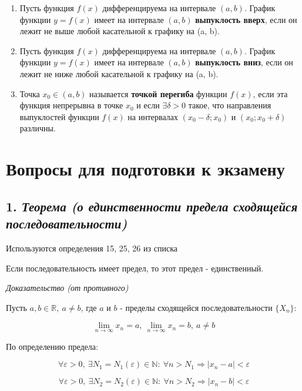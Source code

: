 \begin{enumerate}
\item Пусть функция $f(x)$ дифференцируема на интервале $(a, b)$. График функции $y = f(x)$ имеет на интервале $(a, b)$ \textbf{выпуклость вверх}, если он лежит не выше любой касательной к графику на (a, b).
\item Пусть функция $f(x)$ дифференцируема на интервале $(a, b)$. График функции $y = f(x)$ имеет на интервале $(a, b)$ \textbf{выпуклость вниз}, если он лежит не ниже любой касательной к графику на (a, b).
\item Точка $x_0 \in (a,b)$ называется \textbf{точкой перегиба} функции $f(x)$, если эта функция непрерывна в точке $x_0$ и если $\exists \delta > 0$ такое, что направления выпуклостей функции $f(x)$ на интервалах $(x_0-\delta; x_0)$ и $(x_0; x_0+\delta)$ различны.

\end{enumerate}
\newpage 
\section*{Вопросы для подготовки к экзамену}
\subsection*{1. \textit{Теорема (о единственности предела сходящейся последовательности)}}
\begin{Quote2} 
\small\centering 

Используются определения 15, 25, 26 из списка \end{Quote2} 

Если последовательность имеет предел, то этот предел - единственный.
\vspace*{20pt} 

\textit{Доказательство (от противного)}

Пусть $a, b \in \mathbb{R}, \ a \neq b$, где $a$ и $b$ - пределы сходящейся последовательности $\{X_n\}$:

$$
\lim\limits_{n \to \infty} x_n = a,\ \lim\limits_{n \to \infty} x_n = b, \ a \neq b
$$

По определению предела:

$$
\forall {\varepsilon} > 0, \ \exists N_1 = N_1({\varepsilon}) \in \mathbb{N} : \ \forall n > N_1 \Rightarrow  | x_n - a|  < {\varepsilon} 
$$

$$
\forall {\varepsilon} > 0, \ \exists N_2 = N_2({\varepsilon}) \in \mathbb{N} : \ \forall n > N_2 \Rightarrow  | x_n - b|  < {\varepsilon} 
$$

